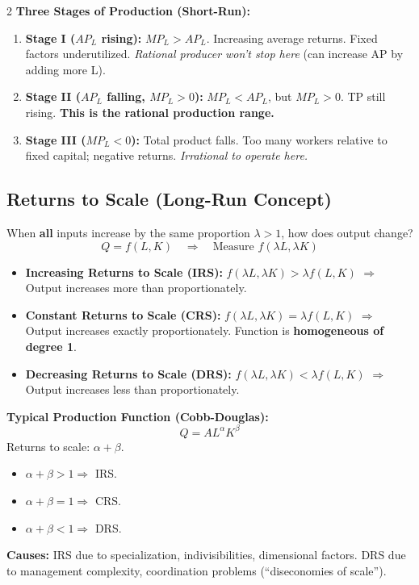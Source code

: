 \documentclass[10pt,a4paper]{article}
\begin{document}
\begin{multicols}{2}
\textbf{Three Stages of Production (Short-Run):}
\begin{enumerate}[leftmargin=*,nosep]
    \item \textbf{Stage I ($AP_L$ rising):} $MP_L > AP_L$. Increasing average returns. Fixed factors underutilized. \textit{Rational producer won't stop here} (can increase AP by adding more L).
    \item \textbf{Stage II ($AP_L$ falling, $MP_L > 0$):} $MP_L < AP_L$, but $MP_L > 0$. TP still rising. \textbf{This is the rational production range.}
    \item \textbf{Stage III ($MP_L < 0$):} Total product falls. Too many workers relative to fixed capital; negative returns. \textit{Irrational to operate here.}
\end{enumerate}

\subsection*{Returns to Scale (Long-Run Concept)}
When \textbf{all} inputs increase by the same proportion $\lambda > 1$, how does output change?
\[
Q = f(L, K) \quad \Rightarrow \quad \text{Measure } f(\lambda L, \lambda K)
\]
\begin{itemize}[leftmargin=*,nosep]
    \item \textbf{Increasing Returns to Scale (IRS):} $f(\lambda L, \lambda K) > \lambda f(L, K)$ $\Rightarrow$ Output increases more than proportionately.
    \item \textbf{Constant Returns to Scale (CRS):} $f(\lambda L, \lambda K) = \lambda f(L, K)$ $\Rightarrow$ Output increases exactly proportionately. Function is \textbf{homogeneous of degree 1}.
    \item \textbf{Decreasing Returns to Scale (DRS):} $f(\lambda L, \lambda K) < \lambda f(L, K)$ $\Rightarrow$ Output increases less than proportionately.
\end{itemize}

\textbf{Typical Production Function (Cobb-Douglas):}
\[
Q = A L^\alpha K^\beta
\]
Returns to scale: $\alpha + \beta$.
\begin{itemize}[nosep]
    \item $\alpha + \beta > 1 \Rightarrow$ IRS.
    \item $\alpha + \beta = 1 \Rightarrow$ CRS.
    \item $\alpha + \beta < 1 \Rightarrow$ DRS.
\end{itemize}

\textbf{Causes:} IRS due to specialization, indivisibilities, dimensional factors. DRS due to management complexity, coordination problems (``diseconomies of scale'').


\end{multicols}
\end{document}
